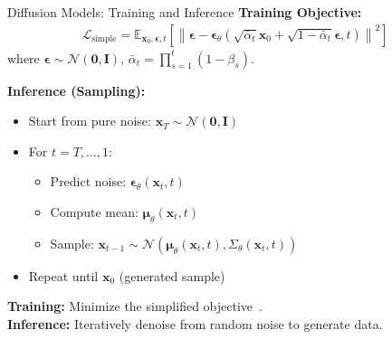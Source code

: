 \begin{refsection}
\begin{frame}{Diffusion Models: Training and Inference}
  \footnotesize
  \textbf{Training Objective:}
  \begin{align*}
    \mathcal{L}_{\mathrm{simple}} = \mathbb{E}_{\mathbf{x}_0, \boldsymbol{\epsilon}, t} \left[ \left\| \boldsymbol{\epsilon} - \boldsymbol{\epsilon}_\theta(\sqrt{\bar{\alpha}_t}\mathbf{x}_0 + \sqrt{1-\bar{\alpha}_t}\boldsymbol{\epsilon}, t) \right\|^2 \right]
  \end{align*}
  where $\boldsymbol{\epsilon} \sim \mathcal{N}(\mathbf{0}, \mathbf{I})$, $\bar{\alpha}_t = \prod_{s=1}^t (1-\beta_s)$.

  \vspace{0.5em}
  \textbf{Inference (Sampling):}
  \begin{itemize}
    \item Start from pure noise: $\mathbf{x}_T \sim \mathcal{N}(\mathbf{0}, \mathbf{I})$
    \item For $t = T, \ldots, 1$:
      \begin{itemize}
        \item Predict noise: $\boldsymbol{\epsilon}_\theta(\mathbf{x}_t, t)$
        \item Compute mean: $\boldsymbol{\mu}_\theta(\mathbf{x}_t, t)$
        \item Sample: $\mathbf{x}_{t-1} \sim \mathcal{N}(\boldsymbol{\mu}_\theta(\mathbf{x}_t, t), \Sigma_\theta(\mathbf{x}_t, t))$
      \end{itemize}
    \item Repeat until $\mathbf{x}_0$ (generated sample)
  \end{itemize}

  \vspace{0.5em}
  \scriptsize
  \textbf{Training:} Minimize the simplified objective~\parencite{ho2020denoising}.\\
  \textbf{Inference:} Iteratively denoise from random noise to generate data.
  \bottomleftrefs
\end{frame}
\end{refsection}


